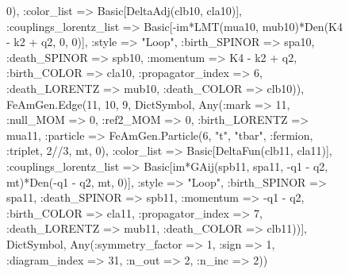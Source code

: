 \documentclass{revtex4}
\begin{document}
\begin{figure}[!htb]
\begin{center}
{0), :color_list => Basic[DeltaAdj(clb10, cla10)], :couplings_lorentz_list => Basic[-im*LMT(mua10, mub10)*Den(K4 - k2 + q2, 0, 0)], :style => "Loop", :birth_SPINOR => spa10, :death_SPINOR => spb10, :momentum => K4 - k2 + q2, :birth_COLOR => cla10, :propagator_index => 6, :death_LORENTZ => mub10, :death_COLOR => clb10)), FeAmGen.Edge(11, 10, 9, Dict{Symbol, Any}(:mark => 11, :null_MOM => 0, :ref2_MOM => 0, :birth_LORENTZ => mua11, :particle => FeAmGen.Particle(6, "t", "tbar", :fermion, :triplet, 2//3, mt, 0), :color_list => Basic[DeltaFun(clb11, cla11)], :couplings_lorentz_list => Basic[im*GAij(spb11, spa11, -q1 - q2, mt)*Den(-q1 - q2, mt, 0)], :style => "Loop", :birth_SPINOR => spa11, :death_SPINOR => spb11, :momentum => -q1 - q2, :birth_COLOR => cla11, :propagator_index => 7, :death_LORENTZ => mub11, :death_COLOR => clb11))], Dict{Symbol, Any}(:symmetry_factor => 1, :sign => 1, :diagram_index => 31, :n_out => 2, :n_inc => 2)) 
}
\end{center}
\end{figure}
\end{document}
